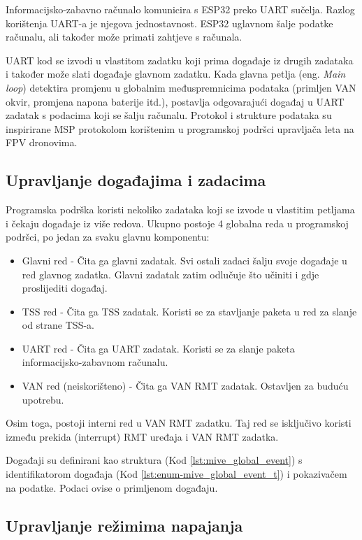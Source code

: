 Informacijsko-zabavno računalo komunicira s ESP32 preko UART sučelja. Razlog korištenja UART-a je njegova jednostavnost. 
ESP32 uglavnom šalje podatke računalu, ali također može primati zahtjeve s računala.

\noindent
UART kod se izvodi u vlastitom zadatku koji prima događaje iz drugih zadataka i također može slati događaje glavnom zadatku. 
Kada glavna petlja (eng. \textit{Main loop}) detektira promjenu u globalnim međuspremnicima podataka (primljen VAN okvir, promjena napona baterije itd.), 
postavlja odgovarajući događaj u UART zadatak s podacima koji se šalju računalu. 
Protokol i strukture podataka su inspirirane MSP protokolom korištenim u programskoj podršci upravljača leta na FPV dronovima.

\subsection{Upravljanje događajima i zadacima}

Programska podrška koristi nekoliko zadataka koji se izvode u vlastitim petljama i čekaju događaje iz više redova. Ukupno postoje 4 globalna reda u programskoj podršci, po jedan za svaku glavnu komponentu:
\begin{itemize}
\item Glavni red - Čita ga glavni zadatak. Svi ostali zadaci šalju svoje događaje u red glavnog zadatka. Glavni zadatak zatim odlučuje što učiniti i gdje proslijediti događaj.
\item TSS red - Čita ga TSS zadatak. Koristi se za stavljanje paketa u red za slanje od strane TSS-a.
\item UART red - Čita ga UART zadatak. Koristi se za slanje paketa informacijsko-zabavnom računalu.
\item VAN red (neiskorišteno) - Čita ga VAN RMT zadatak. Ostavljen za buduću upotrebu.
\end{itemize}

\noindent
Osim toga, postoji interni red u VAN RMT zadatku. Taj red se isključivo koristi između prekida (interrupt) RMT uređaja i VAN RMT zadatka.

\bigskip
\noindent
Događaji su definirani kao struktura (Kod \ref{lst:mive_global_event}) s identifikatorom događaja (Kod \ref{lst:enum-mive_global_event_t}) i pokazivačem na podatke. 
Podaci ovise o primljenom događaju.

\subsection{Upravljanje režimima napajanja}

